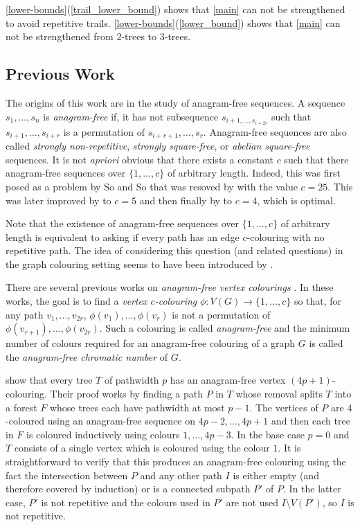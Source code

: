 \documentclass[kpfonts]{patmorin}
\begin{document}
\cref{lower-bounds}(\ref{trail_lower_bound}) shows that \cref{main} can not be strengthened to avoid repetitive trails.  \cref{lower-bounds}(\ref{lower_bound}) shows that \cref{main} can not be strengthened from $2$-trees to $3$-trees.

\subsection{Previous Work}
\label{previous_work}

The origins of this work are in the study of anagram-free sequences.  A sequence $s_1,\ldots,s_n$ is \emph{anagram-free} if, it has not subsequence $s_{i+1,\ldots,s_{i+2r}}$ such that $s_{i+1},\ldots,s_{i+r}$ is a permutation of $s_{i+r+1},\ldots,s_{r}$.  Anagram-free sequences are also called \emph{strongly non-repetitive}, \emph{strongly square-free}, or \emph{abelian square-free} sequences.  It is not \emph{apriori} obvious that there exists a constant $c$ such that there anagram-free sequences over $\{1,\ldots,c\}$ of arbitrary length.  Indeed, this was first posed as a problem by So and So \citet{so.so:huh} that was resoved by \citet{x.y.X} with the value $c=25$. This was later improved by \cite{pleasants:X} to $c=5$ and then finally by \citet{karkainnen:X} to $c=4$, which is optimal.

Note that the existence of anagram-free sequences over $\{1,\ldots,c\}$ of arbitrary length is equivalent to asking if every path has an edge $c$-colouring with no repetitive path.  The idea of considering this question (and related questions) in the graph colouring setting seems to have been introduced by \cite{alon.ea}.

There are several previous works on \emph{anagram-free vertex colourings} \cite{wilson.wood:anagram-free, kamcev.luczak.ea:anagram-free, carmi.dujmovic.ea:anagram-free, wilson.wood:anagram-free2}.  In these works, the goal is to find a \emph{vertex $c$-colouring} $\phi:V(G)\to\{1,\ldots,c\}$ so that, for any path $v_1,\ldots,v_{2r}$, $\phi(v_1),\ldots,\phi(v_r)$ is not a permutation of $\phi(v_{r+1}),\ldots,\phi(v_{2r})$. Such a colouring is called \emph{anagram-free} and the minimum number of colours required for an anagram-free colouring of a graph $G$ is called the \emph{anagram-free chromatic number} of $G$.  

\citet{wilson.wood:anagram-free} show that every tree $T$ of pathwidth $p$ has an anagram-free vertex $(4p+1)$-colouring.  Their proof works by finding a path $P$ in $T$ whose removal splits $T$ into a forest $F$ whose trees each have pathwidth at most $p-1$.  The vertices of $P$ are $4$-coloured using an anagram-free sequence on $4p-2,\ldots,4p+1$ and then each tree in $F$ is coloured inductively using colours $1,\ldots,4p-3$.  In the base case $p=0$ and $T$ consists of a single vertex which is coloured using the colour $1$.  It is straightforward to verify that this produces an anagram-free colouring using the fact the intersection between $P$ and any other path $I$ is either empty (and therefore covered by induction) or is a connected subpath $P'$ of $P$. In the latter case, $P'$ is not repetitive and the colours used in $P'$ are not used $I\setminus V(P')$, so $I$ is not repetitive.
\end{document}
